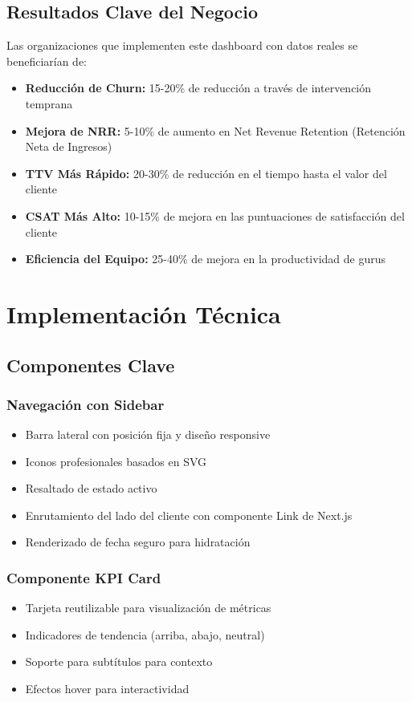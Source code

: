 \documentclass[12pt,a4paper]{article}
\begin{document}
\subsection{Resultados Clave del Negocio}

Las organizaciones que implementen este dashboard con datos reales se beneficiarían de:

\begin{itemize}
    \item \textbf{Reducción de Churn:} 15-20\% de reducción a través de intervención temprana
    \item \textbf{Mejora de NRR:} 5-10\% de aumento en Net Revenue Retention (Retención Neta de Ingresos)
    \item \textbf{TTV Más Rápido:} 20-30\% de reducción en el tiempo hasta el valor del cliente
    \item \textbf{CSAT Más Alto:} 10-15\% de mejora en las puntuaciones de satisfacción del cliente
    \item \textbf{Eficiencia del Equipo:} 25-40\% de mejora en la productividad de gurus
\end{itemize}

\section{Implementación Técnica}

\subsection{Componentes Clave}

\subsubsection{Navegación con Sidebar}
\begin{itemize}
    \item Barra lateral con posición fija y diseño responsive
    \item Iconos profesionales basados en SVG
    \item Resaltado de estado activo
    \item Enrutamiento del lado del cliente con componente Link de Next.js
    \item Renderizado de fecha seguro para hidratación
\end{itemize}

\subsubsection{Componente KPI Card}
\begin{itemize}
    \item Tarjeta reutilizable para visualización de métricas
    \item Indicadores de tendencia (arriba, abajo, neutral)
    \item Soporte para subtítulos para contexto
    \item Efectos hover para interactividad
\end{itemize}
\end{document}
